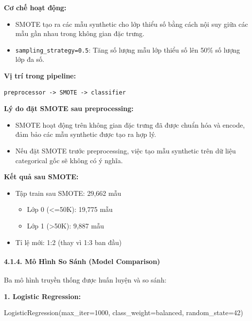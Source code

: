 \documentclass[
]{article}
\newenvironment{Shaded}{}{}
\newcommand{\DecValTok}[1]{\textcolor[rgb]{0.25,0.63,0.44}{#1}}
\newcommand{\NormalTok}[1]{#1}
\newcommand{\OperatorTok}[1]{\textcolor[rgb]{0.40,0.40,0.40}{#1}}
\newcommand{\StringTok}[1]{\textcolor[rgb]{0.25,0.44,0.63}{#1}}
\providecommand{\tightlist}{%
  \setlength{\itemsep}{0pt}\setlength{\parskip}{0pt}}
\begin{document}
\textbf{Cơ chế hoạt động:}

\begin{itemize}
\tightlist
\item
  SMOTE tạo ra các mẫu synthetic cho lớp thiểu số bằng cách nội suy giữa
  các mẫu gần nhau trong không gian đặc trưng.
\item
  \texttt{sampling\_strategy=0.5}: Tăng số lượng mẫu lớp thiểu số lên
  50\% số lượng lớp đa số.
\end{itemize}

\textbf{Vị trí trong pipeline:}

\begin{verbatim}
preprocessor -> SMOTE -> classifier
\end{verbatim}

\textbf{Lý do đặt SMOTE sau preprocessing:}

\begin{itemize}
\tightlist
\item
  SMOTE hoạt động trên không gian đặc trưng đã được chuẩn hóa và encode,
  đảm bảo các mẫu synthetic được tạo ra hợp lý.
\item
  Nếu đặt SMOTE trước preprocessing, việc tạo mẫu synthetic trên dữ liệu
  categorical gốc sẽ không có ý nghĩa.
\end{itemize}

\textbf{Kết quả sau SMOTE:}

\begin{itemize}
\tightlist
\item
  Tập train sau SMOTE: 29,662 mẫu

  \begin{itemize}
  \tightlist
  \item
    Lớp 0 (\textless=50K): 19,775 mẫu
  \item
    Lớp 1 (\textgreater50K): 9,887 mẫu
  \end{itemize}
\item
  Tỉ lệ mới: 1:2 (thay vì 1:3 ban đầu)
\end{itemize}

\paragraph{4.1.4. Mô Hình So Sánh (Model
Comparison)}\label{414-muxf4-huxecnh-so-suxe1nh-model-comparison}

Ba mô hình truyền thống được huấn luyện và so sánh:

\textbf{1. Logistic Regression:}

\begin{Shaded}
\begin{Highlighting}[]
\NormalTok{LogisticRegression(max\_iter}\OperatorTok{=}\DecValTok{1000}\NormalTok{, class\_weight}\OperatorTok{=}\StringTok{\textquotesingle{}balanced\textquotesingle{}}\NormalTok{, random\_state}\OperatorTok{=}\DecValTok{42}\NormalTok{)}
\end{Highlighting}
\end{Shaded}
\end{document}
